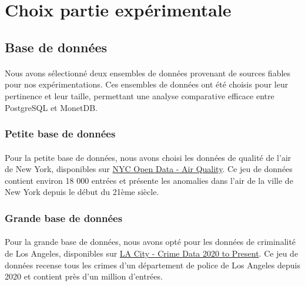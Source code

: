 \documentclass[11pt]{extarticle}
\begin{document}
\vspace{1cm} %

\section{Choix partie expérimentale}

\subsection{Base de données}
\paragraph{}
Nous avons sélectionné deux ensembles de données provenant de sources fiables pour nos expérimentations. Ces ensembles de données ont été choisis pour leur pertinence et leur taille, permettant une analyse comparative efficace entre PostgreSQL et MonetDB.

\subsubsection{Petite base de données}
\paragraph{}
Pour la petite base de données, nous avons choisi les données de qualité de l'air de New York, disponibles sur \href{https://catalog.data.gov/dataset/air-quality}{NYC Open Data - Air Quality}. Ce jeu de données contient environ 18 000 entrées et présente les anomalies dans l'air de la ville de New York depuis le début du 21ème siècle.

\subsubsection{Grande base de données}
\paragraph{}
Pour la grande base de données, nous avons opté pour les données de criminalité de Los Angeles, disponibles sur \href{https://catalog.data.gov/dataset/crime-data-from-2020-to-present}{LA City - Crime Data 2020 to Present}. Ce jeu de données recense tous les crimes d'un département de police de Los Angeles depuis 2020 et contient près d'un million d'entrées.
\end{document}
